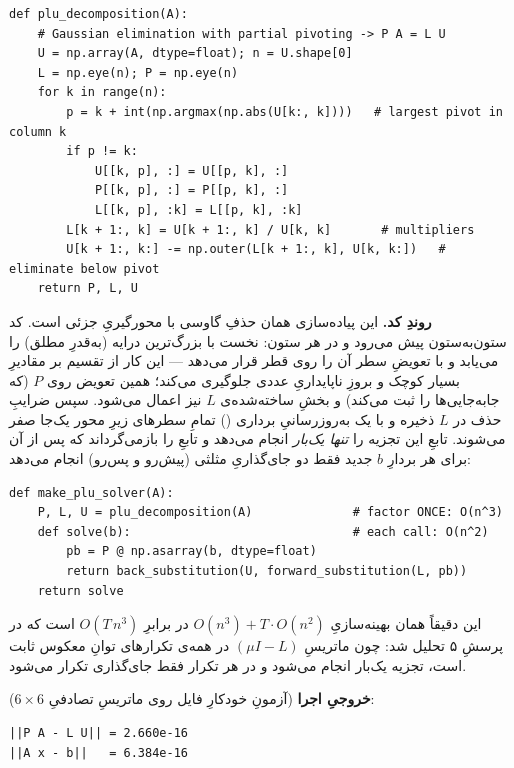 \documentclass[13pt]{extarticle}
\newenvironment{pycode}{\begin{latin}\lstset{style=py}}{\end{latin}}
\newenvironment{consoleout}{\par\smallskip\begin{latin}\lstset{style=out}}{\end{latin}}
\newcommand{\file}[1]{\lr{\texttt{#1}}}
\begin{document}
\begin{pycode}
\begin{lstlisting}
def plu_decomposition(A):
    # Gaussian elimination with partial pivoting -> P A = L U
    U = np.array(A, dtype=float); n = U.shape[0]
    L = np.eye(n); P = np.eye(n)
    for k in range(n):
        p = k + int(np.argmax(np.abs(U[k:, k])))   # largest pivot in column k
        if p != k:
            U[[k, p], :] = U[[p, k], :]
            P[[k, p], :] = P[[p, k], :]
            L[[k, p], :k] = L[[p, k], :k]
        L[k + 1:, k] = U[k + 1:, k] / U[k, k]       # multipliers
        U[k + 1:, k:] -= np.outer(L[k + 1:, k], U[k, k:])   # eliminate below pivot
    return P, L, U
\end{lstlisting}
\end{pycode}

\noindent\textbf{روندِ کد.} این پیاده‌سازی همان حذفِ گاوسی با محورگیریِ جزئی است. کد ستون‌به‌ستون پیش می‌رود و در هر ستون: نخست با \file{argmax} بزرگ‌ترین درایه (به‌قدرِ مطلق) را می‌یابد و با تعویضِ سطر آن را روی قطر قرار می‌دهد --- این کار از تقسیم بر مقادیرِ بسیار کوچک و بروزِ ناپایداریِ عددی جلوگیری می‌کند؛ همین تعویض روی $P$ (که جابه‌جایی‌ها را ثبت می‌کند) و بخشِ ساخته‌شده‌ی $L$ نیز اعمال می‌شود. سپس ضرایبِ حذف در $L$ ذخیره و با یک به‌روزرسانیِ برداری (\file{np.outer}) تمامِ سطرهای زیرِ محور یک‌جا صفر می‌شوند. تابعِ \file{make\_plu\_solver} این تجزیه را \emph{تنها یک‌بار} انجام می‌دهد و تابعِ \file{solve} را بازمی‌گرداند که پس از آن برای هر بردارِ $b$ جدید فقط دو جای‌گذاریِ مثلثی (پیش‌رو و پس‌رو) انجام می‌دهد:

\begin{pycode}
\begin{lstlisting}
def make_plu_solver(A):
    P, L, U = plu_decomposition(A)              # factor ONCE: O(n^3)
    def solve(b):                               # each call: O(n^2)
        pb = P @ np.asarray(b, dtype=float)
        return back_substitution(U, forward_substitution(L, pb))
    return solve
\end{lstlisting}
\end{pycode}

\noindent این دقیقاً همان بهینه‌سازیِ $O(n^3)+T\cdot O(n^2)$ در برابرِ $O(T\,n^3)$ است که در پرسشِ ۵ تحلیل شد: چون ماتریسِ $(\mu I-L)$ در همه‌ی تکرارهای توانِ معکوس ثابت است، تجزیه یک‌بار انجام می‌شود و در هر تکرار فقط جای‌گذاری تکرار می‌شود.

\smallskip
\noindent\textbf{خروجیِ اجرا} (آزمونِ خودکارِ فایل روی ماتریسِ تصادفیِ $6\times6$):
\begin{consoleout}
\begin{lstlisting}
||P A - L U|| = 2.660e-16
||A x - b||   = 6.384e-16
\end{lstlisting}
\end{consoleout}
\end{document}
